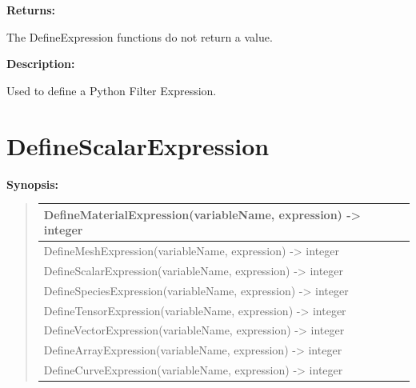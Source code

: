 \documentclass[letterpaper,10pt,english]{sphinxmanual}
\begin{document}
\begin{DUlineblock}{0em}
\item[] 
\item[] \textbf{Returns:}
\item[] The DefineExpression functions do not return a value.
\item[] 
\item[] \textbf{Description:}
\item[] Used to define a Python Filter Expression.
\end{DUlineblock}

\begin{DUlineblock}{0em}
\item[] 
\end{DUlineblock}


\section{DefineScalarExpression}
\label{functions:definescalarexpression}
\begin{DUlineblock}{0em}
\item[] \textbf{Synopsis:}
\end{DUlineblock}
\begin{quote}

\begin{tabulary}{\linewidth}{|L|}
\hline

DefineMaterialExpression(variableName, expression) -\textgreater{} integer
\\
\hline
DefineMeshExpression(variableName, expression) -\textgreater{} integer
\\
\hline
DefineScalarExpression(variableName, expression) -\textgreater{} integer
\\
\hline
DefineSpeciesExpression(variableName, expression) -\textgreater{} integer
\\
\hline
DefineTensorExpression(variableName, expression) -\textgreater{} integer
\\
\hline
DefineVectorExpression(variableName, expression) -\textgreater{} integer
\\
\hline
DefineArrayExpression(variableName, expression) -\textgreater{} integer
\\
\hline
DefineCurveExpression(variableName, expression) -\textgreater{} integer
\\
\hline\end{tabulary}

\end{quote}
\end{document}
